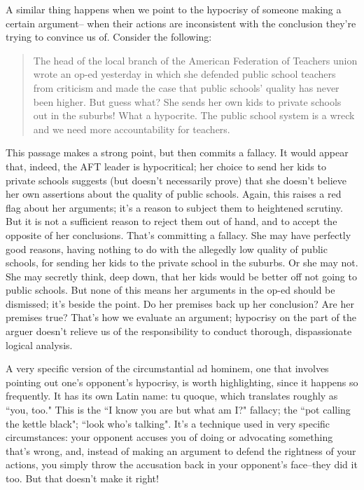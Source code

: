 A similar thing happens when we point to the hypocrisy of someone making a certain argument--
when their actions are inconsistent with the conclusion they're trying to convince us of. Consider
the following:

\begin{quote}The head of the local branch of the American Federation of Teachers union wrote an op-ed yesterday in which she defended public school teachers from criticism and made the
case that public schools' quality has never been higher. But guess what? She sends her own
kids to private schools out in the suburbs! What a hypocrite. The public school system is a
wreck and we need more accountability for teachers.
\end{quote}

This passage makes a strong point, but then commits a fallacy. It would appear that, indeed, the
AFT leader is hypocritical; her choice to send her kids to private schools suggests (but doesn't
necessarily prove) that she doesn't believe her own assertions about the quality of public schools.
Again, this raises a red flag about her arguments; it's a reason to subject them to heightened
scrutiny. But it is not a sufficient reason to reject them out of hand, and to accept the opposite of
her conclusions. That's committing a fallacy. She may have perfectly good reasons, having nothing
to do with the allegedly low quality of public schools, for sending her kids to the private school in
the suburbs. Or she may not. She may secretly think, deep down, that her kids would be better off
not going to public schools. But none of this means her arguments in the op-ed should be
dismissed; it's beside the point. Do her premises back up her conclusion? Are her premises true?
That's how we evaluate an argument; hypocrisy on the part of the arguer doesn't relieve us of the
responsibility to conduct thorough, dispassionate logical analysis.

A very specific version of the circumstantial ad hominem, one that involves pointing out one's
opponent's hypocrisy, is worth highlighting, since it happens so frequently. It has its own Latin
name: tu quoque, which translates roughly as ``you, too." This is the ``I know you are but what am
I?" fallacy; the ``pot calling the kettle black"; ``look who's talking". It's a technique used in very
specific circumstances: your opponent accuses you of doing or advocating something that's wrong,
and, instead of making an argument to defend the rightness of your actions, you simply throw the
accusation back in your opponent's face--they did it too. But that doesn't make it right!

